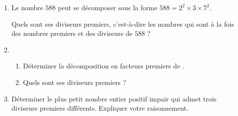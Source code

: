 
\medskip

\begin{enumerate}
\item Le nombre $588$ peut se décomposer sous la forme $588 = 2^2 \times  3 \times 7^2$.

Quels sont ses diviseurs premiers, c'est-à-dire les nombres qui sont à la fois des nombres premiers et des diviseurs de $588$ ?
\item 
	\begin{enumerate}
		\item Déterminer la décomposition en facteurs premiers de .
		\item Quels sont ses diviseurs premiers ?
	\end{enumerate}
\item Déterminer le plus petit nombre entier positif impair qui admet trois diviseurs premiers différents. Expliquer votre raisonnement.
\end{enumerate}

\vspace{0,5cm}

